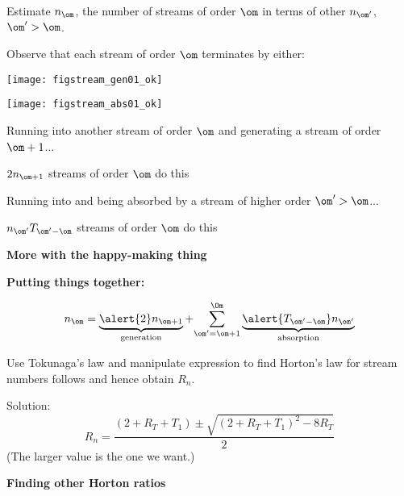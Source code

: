 \begin{frame}[label=]
\begin{frame}[label=]
\begin{frame}[label=]
      Estimate $n_\om$, the number of streams of order $\om$ in terms 
      of other $n_{\om'}$, $\om'>\om$.
     
      Observe that each stream of order $\om$ terminates by either:
              
                  
          
          \texttt{[image: figstream\_gen01\_ok]}
                          
          
          \texttt{[image: figstream\_abs01\_ok]}
                
        
         Running into another stream of order $\om$ and 
          generating a stream of order $\om+1$...
          {
            
              \alert{$2n_{\om+1}$ streams of order $\om$ do this}
            
          }
         Running into and being absorbed by a stream
          of higher order $\om'>\om$...
          {
            
             \alert{$n_{\om'} T_{\om'-\om}$ streams of order $\om$ do this}
            
          }
        
          
  


\begin{frame}[label=]
  \textbf{More with the happy-making thing}

  \textbf{Putting things together:}
    
    
      $$
      n_\om
      =
      \underbrace{\alert{2}n_{\om+1}}_{\textnormal{generation}}
      +
      {
      \sum_{\om'=\om+1}^{\Om}
      \underbrace{\alert{T_{\om'-\om}} n_{\om'}}_{\textnormal{absorption}}
      }
      $$
    
      Use Tokunaga's law and manipulate expression
      to find Horton's law for stream numbers follows
      and hence obtain $R_n$.
    
    
      Solution:
      $$
      R_n
      =
      \frac{
      (2+R_T+T_1)
      \pm 
      \sqrt{
        (2+R_T+T_1)^2-8R_T
        }
      }
      {2}
      $$
      (The larger value is the one we want.)
    
  



\begin{frame}[label=]
  \textbf{Finding other Horton ratios}


\end{frame}
\end{frame}
\end{frame}
\end{frame}
\end{frame}
